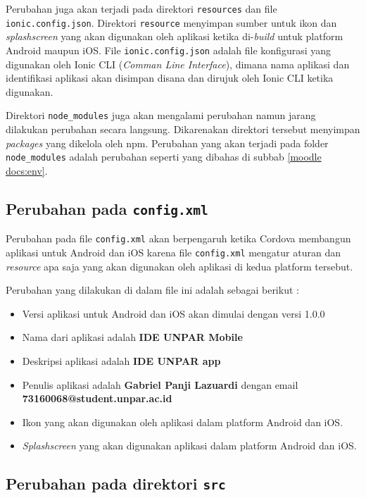 Perubahan juga akan terjadi pada direktori \texttt{resources} dan file \texttt{ionic.config.json}. Direktori \texttt{resource} menyimpan sumber untuk ikon dan \textit{splashscreen} yang akan digunakan oleh aplikasi ketika di-\textit{build} untuk platform Android maupun iOS. File \texttt{ionic.config.json} adalah file konfigurasi yang digunakan oleh  Ionic CLI (\textit{Comman Line Interface}), dimana nama aplikasi dan identifikasi aplikasi akan disimpan disana dan dirujuk oleh Ionic CLI ketika digunakan.

Direktori \texttt{node\_modules} juga akan mengalami perubahan namun jarang dilakukan perubahan secara langsung. Dikarenakan direktori tersebut menyimpan \textit{packages} yang dikelola oleh npm. Perubahan yang akan terjadi pada folder \texttt{node\_modules} adalah perubahan seperti yang dibahas di subbab \ref{moodle docs:env}.

\subsection{Perubahan pada \texttt{config.xml}}
Perubahan pada file \texttt{config.xml} akan berpengaruh ketika Cordova membangun aplikasi untuk Android dan iOS karena file \texttt{config.xml} mengatur aturan dan \textit{resource} apa saja yang akan digunakan oleh aplikasi di kedua platform tersebut. 

Perubahan yang dilakukan di dalam file ini adalah sebagai berikut : 

\begin{itemize}
\item Versi aplikasi untuk Android dan iOS akan dimulai dengan versi 1.0.0
\item Nama dari aplikasi adalah \textbf{IDE UNPAR Mobile}
\item Deskripsi aplikasi adalah \textbf{IDE UNPAR app}
\item Penulis aplikasi adalah \textbf{Gabriel Panji Lazuardi} dengan email \textbf{73160068@student.unpar.ac.id}
\item Ikon yang akan digunakan oleh aplikasi dalam platform Android dan iOS.
\item \textit{Splashscreen} yang akan digunakan aplikasi dalam platform Android dan iOS.
\end{itemize}  

\subsection{Perubahan pada direktori \texttt{src}}

